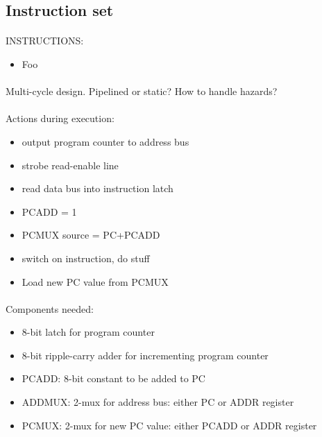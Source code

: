 \subsection{Instruction set}
\paragraph*{}
INSTRUCTIONS:
\begin{itemize}
\item Foo
\end{itemize}

\paragraph*{}
Multi-cycle design. Pipelined or static? How to handle hazards?

\paragraph*{}
Actions during execution:
\begin{itemize}
\item output program counter to address bus
\item strobe read-enable line
\item read data bus into instruction latch
\item PCADD = 1
\item PCMUX source = PC+PCADD
\item switch on instruction, do stuff
\item Load new PC value from PCMUX
\end{itemize}

\paragraph*{}
Components needed:
\begin{itemize}
\item 8-bit latch for program counter
\item 8-bit ripple-carry adder for incrementing program counter
\item PCADD: 8-bit constant to be added to PC
\item ADDMUX: 2-mux for address bus: either PC or ADDR register
\item PCMUX: 2-mux for new PC value: either PCADD or ADDR register
\end{itemize}
